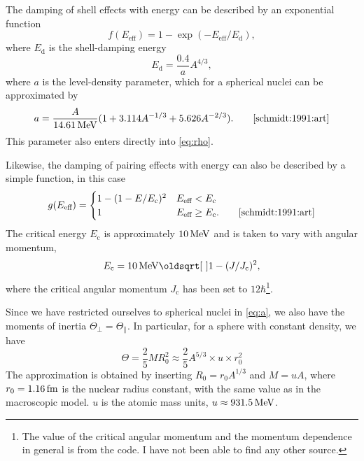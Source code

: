 The damping of shell effects with energy can be described by an exponential function
\begin{equation}
f(E_\text{eff}) = 1-\exp{\left(-E_\text{eff}/E_\text{d}\right)},
\end{equation}
where $E_\text{d}$ is the shell-damping energy 
\begin{equation}
E_\text{d} = \frac{0.4}{a} A^{4/3},
\end{equation}
where $a$ is the level-density parameter, which for a spherical nuclei can be approximated by
\begin{equation}
a=\frac{A}{\unit[14.61]{MeV}}(1+3.114 A^{-1/3} + 5.626 A^{-2/3}).\qquad\cite{schmidt:1991:art}\label{eq:a}
\end{equation}
This parameter also enters directly into \eqref{eq:rho}.

Likewise, the damping of pairing effects with energy can also be described by a simple function, in this case
\begin{equation}
g(E_\text{eff}) = \begin{cases} 1-(1-E/E_\text{c})^2 & E_\text{eff} < E_\text{c} \\
 1 & E_\text{eff} \ge E_\text{c}.\qquad\cite{schmidt:1991:art}
\end{cases}
\end{equation}
The critical energy $E_\text{c}$ is approximately $\unit[10]{MeV}$ and is taken to vary with angular momentum, 
\begin{equation}
E_\text{c} = \unit[10]{MeV}\sqrt{1-(J/J_\text{c})^2},
\end{equation}
where the critical angular momentum $J_\text{c}$ has been set to $12\hbar$\footnote{The value of the critical angular momentum and the momentum dependence in general is from the  code. I have not been able to find any other source.}. 

Since we have restricted ourselves to spherical nuclei in \eqref{eq:a}, we also have the moments of inertia $\Theta_\perp = \Theta_\parallel$. In particular, for a sphere with constant density, we have
\begin{equation}
\Theta = \frac{2}{5} M R_0^2 \approx \frac{2}{5} A^{5/3}\times u \times r_0^2
\end{equation}
The approximation is obtained by inserting $R_0 = r_0 A^{1/3}$ and $M=u A$, where $r_0=\unit[1.16]{fm}$ is the nuclear radius constant, with the same value as in the macroscopic model\cite{moller1995}. $u$ is the atomic mass units, $u \approx \unit[931.5]{MeV}$.

